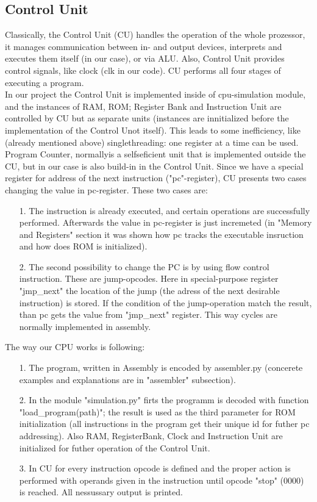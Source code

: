 \documentclass[11pt,a4paper]{article}
\begin{document}
\subsection{Control Unit}
Classically, the Control Unit (CU) handles the operation of the whole prozessor, it manages communication between in- and output devices, interprets and executes them itself (in our case), or via ALU. Also, Control Unit provides control signals, like clock (clk in our code). CU performs all four stages of executing a program.\\
In our project the Control Unit is implemented inside of cpu-simulation module, and the instances of RAM, ROM; Register Bank and Instruction Unit are controlled by CU but as separate units (instances are innitialized before the implementation of the Control Unot itself). This leads to some inefficiency, like (already mentioned above) singlethreading: one register at a time can be used. Program Counter, normallyis a selfseficient unit that is implemented outside the CU, but in our case is also build-in in the Control Unit. Since we have a special register for address of the next instruction ("pc"-register), CU presents two cases changing the value in pc-register. These two cases are:
\begin{enumerate}
	\item[1.] The instruction is already executed, and certain operations are successfully performed. Afterwards the value in pc-register is just incremeted (in "Memory and Registers" section it was shown how pc tracks the executable insruction and how does ROM is initialized). 
	\item[2.] The second possibility to change the PC is by using flow control instruction. These are jump-opcodes. Here in special-purpose register "jmp\_next" the location of the jump (the adress of the next desirable instruction) is stored. If the condition of the jump-operation match the result, than pc gets the value from "jmp\_next" register. This way cycles are normally implemented in assembly.	
\end{enumerate} 
The way our CPU works is following:
\begin{enumerate}
	\item[1.] The program, written in Assembly is encoded by assembler.py (concerete examples and explanations are in "assembler" subsection).
	\item[2.] In the module "simulation.py" firts the programm is decoded with function "load\_program(path)"; the result is used as the third parameter for ROM initialization (all instructions in the program get their unique id for futher pc addressing). Also RAM, RegisterBank, Clock and Instruction Unit are initialized for futher operation of the Control Unit.
	\item[3.] In CU for every instruction opcode is defined and the proper action is performed with operands given in the instruction until opcode "stop" (0000) is reached. All nessussary output is printed.  
\end{enumerate}
\end{document}
